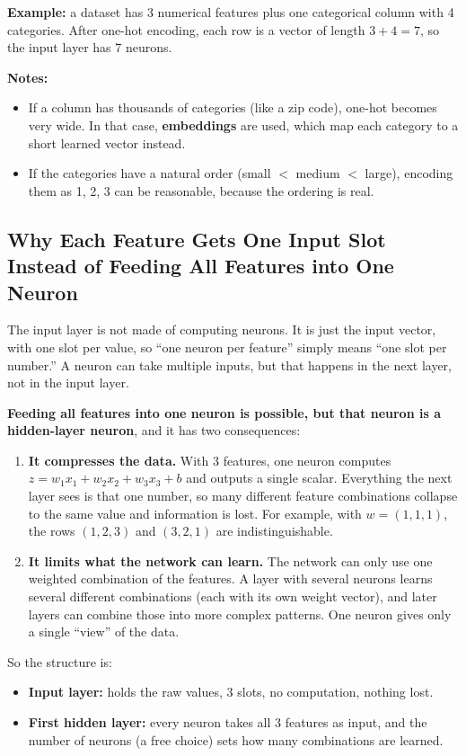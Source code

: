 \textbf{Example:} a dataset has 3 numerical features plus one categorical column with 4 categories. After one-hot encoding, each row is a vector of length $3 + 4 = 7$, so the input layer has 7 neurons.

\textbf{Notes:}
\begin{itemize}
    \item If a column has thousands of categories (like a zip code), one-hot becomes very wide. In that case, \textbf{embeddings} are used, which map each category to a short learned vector instead.
    \item If the categories have a natural order (small $<$ medium $<$ large), encoding them as 1, 2, 3 can be reasonable, because the ordering is real.
\end{itemize}

\subsection*{Why Each Feature Gets One Input Slot Instead of Feeding All Features into One Neuron}

The input layer is not made of computing neurons. It is just the input vector, with one slot per value, so ``one neuron per feature'' simply means ``one slot per number.'' A neuron can take multiple inputs, but that happens in the next layer, not in the input layer.

\textbf{Feeding all features into one neuron is possible, but that neuron is a hidden-layer neuron}, and it has two consequences:

\begin{enumerate}
    \item \textbf{It compresses the data.} With 3 features, one neuron computes $z = w_1 x_1 + w_2 x_2 + w_3 x_3 + b$ and outputs a single scalar. Everything the next layer sees is that one number, so many different feature combinations collapse to the same value and information is lost. For example, with $w = (1, 1, 1)$, the rows $(1, 2, 3)$ and $(3, 2, 1)$ are indistinguishable.
    \item \textbf{It limits what the network can learn.} The network can only use one weighted combination of the features. A layer with several neurons learns several different combinations (each with its own weight vector), and later layers can combine those into more complex patterns. One neuron gives only a single ``view'' of the data.
\end{enumerate}

So the structure is:
\begin{itemize}
    \item \textbf{Input layer:} holds the raw values, 3 slots, no computation, nothing lost.
    \item \textbf{First hidden layer:} every neuron takes all 3 features as input, and the number of neurons (a free choice) sets how many combinations are learned.
\end{itemize}

